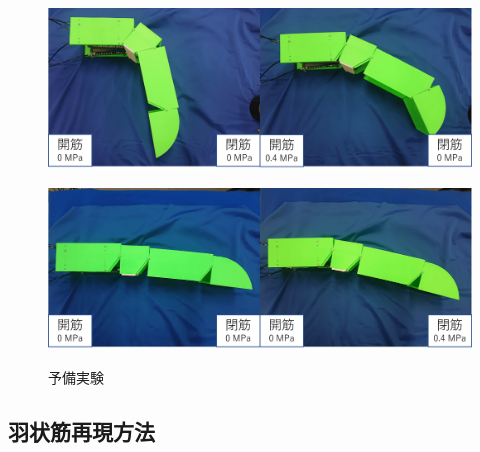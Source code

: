 %
\begin{figure}[t]
  \begin{minipage}{1\hsize}
    \centering
    \includegraphics[scale=0.14]{image/yobi_open.png}
    \vspace{-1mm}
    \label{fig:popen}
  \end{minipage}
  \begin{minipage}{1\hsize}
    \centering
    \vspace{3mm}
    \includegraphics[scale=0.14]{image/yobi_close.png}
    \label{fig:pclose}
  \end{minipage}
  \caption{予備実験}
  \label{fig:yobijikken}
\end{figure}
\subsection{羽状筋再現方法}
